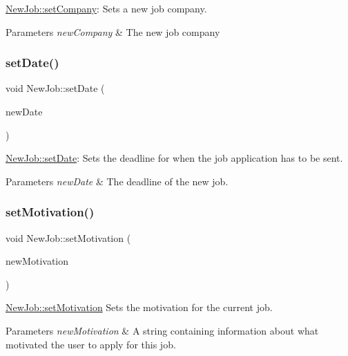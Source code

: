 \mbox{\hyperlink{class_new_job_ad9f522f4a6a45348ecc3ab1229b5eabb}{New\+Job\+::set\+Company}}\+: Sets a new job company. 


\begin{DoxyParams}{Parameters}
{\em new\+Company} & The new job company \\
\hline
\end{DoxyParams}
\mbox{\label{class_new_job_a0a1d9067e72f797ad3b1f01d44fedb0f}} 
\subsubsection{\texorpdfstring{set\+Date()}{setDate()}}
{\footnotesize\ttfamily void New\+Job\+::set\+Date (\begin{DoxyParamCaption}\item[{Q\+String}]{new\+Date }\end{DoxyParamCaption})}



\mbox{\hyperlink{class_new_job_a0a1d9067e72f797ad3b1f01d44fedb0f}{New\+Job\+::set\+Date}}\+: Sets the deadline for when the job application has to be sent. 


\begin{DoxyParams}{Parameters}
{\em new\+Date} & The deadline of the new job. \\
\hline
\end{DoxyParams}
\mbox{\label{class_new_job_a3ddb9ee8bccdf069711406effb9d7dcd}} 
\subsubsection{\texorpdfstring{set\+Motivation()}{setMotivation()}}
{\footnotesize\ttfamily void New\+Job\+::set\+Motivation (\begin{DoxyParamCaption}\item[{Q\+String}]{new\+Motivation }\end{DoxyParamCaption})}



\mbox{\hyperlink{class_new_job_a3ddb9ee8bccdf069711406effb9d7dcd}{New\+Job\+::set\+Motivation}} Sets the motivation for the current job. 


\begin{DoxyParams}{Parameters}
{\em new\+Motivation} & A string containing information about what motivated the user to apply for this job. \\
\hline
\end{DoxyParams}
\mbox{\label{class_new_job_aa184d2046d0e60e82cd5840c40b99bed}} 
